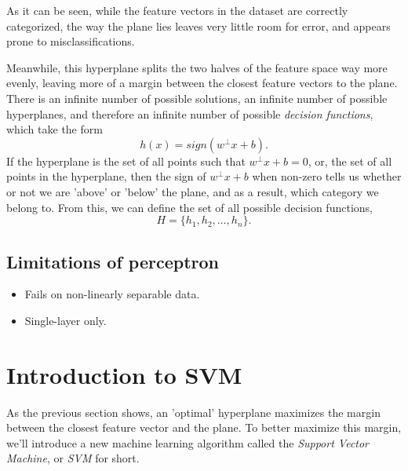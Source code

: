 As it can be seen, while the feature vectors in the dataset are correctly categorized, the way the plane lies leaves very little room for error, and appears prone to misclassifications.


Meanwhile, this hyperplane splits the two halves of the feature space way more evenly, leaving more of a margin between the closest feature vectors to the plane. There is an infinite number of possible solutions, an infinite number of possible hyperplanes, and therefore an infinite number of possible \textit{decision functions}, which take the form
\[
    h(x) = sign(w^\perp x+b).
\]
If the hyperplane is the set of all points such that $w^\perp x+b=0$, or, the set of all points in the hyperplane, then the sign of $w^\perp x+b$ when non-zero tells us whether or not we are 'above' or 'below' the plane, and as a result, which category we belong to. From this, we can define the set of all possible decision functions,
\[
    H = \{h_1, h_2, \dots, h_n\}.
\]

\subsection{Limitations of perceptron}
\begin{itemize}
    \item Fails on non-linearly separable data.
    \item Single-layer only.
\end{itemize}

\section{Introduction to SVM}
As the previous section shows, an 'optimal' hyperplane maximizes the margin between the closest feature vector and the plane. To better maximize this margin, we'll introduce a new machine learning algorithm called the \textit{Support Vector Machine}\cite{scholkopf2002learning}\cite{vapnik1998statistical}, or \textit{SVM} for short.

